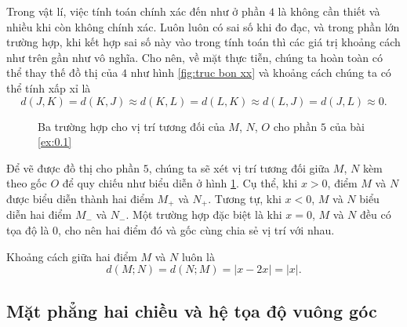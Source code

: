 \documentclass[a4paper, titlepage, openany]{book}
\begin{document}
Trong vật lí, việc tính toán chính xác đến như ở phần $4$ là không cần thiết và nhiều khi còn không chính xác. Luôn luôn có sai số khi đo đạc, và trong phần lớn trường hợp, khi kết hợp sai số này vào trong tính toán thì các giá trị khoảng cách như trên gần như vô nghĩa. Cho nên, về mặt thực tiễn, chúng ta hoàn toàn có thể thay thế đồ thị của $4$ như hình \ref{fig:truc bon xx} và khoảng cách chúng ta có thể tính xấp xỉ là $$d(J,K) = d(K,J) \approx d(K,L) = d(L,K) \approx d(L,J) = d(J,L) \approx 0.$$

\begin{figure}[h]
   \centering
   \caption{Ba trường hợp cho vị trí tương đối của $M$, $N$, $O$ cho phần $5$ của bài \ref{ex:0.1}}
   \label{fig:truc phan 5}
\end{figure}

Để vẽ được đồ thị cho phần $5$, chúng ta sẽ xét vị trí tương đối giữa $M$, $N$ kèm theo gốc $O$ để quy chiếu như biểu diễn ở hình \ref{fig:truc phan 5}. Cụ thể, khi $x>0$, điểm $M$ và $N$ được biểu diễn thành hai điểm $M_+$ và $N_+$. Tương tự, khi $x<0$, $M$ và $N$ biểu diễn hai điểm $M_-$ và $N_-$. Một trường hợp đặc biệt là khi $x=0$, $M$ và $N$ đều có tọa độ là $0$, cho nên hai điểm đó và gốc cùng chia sẻ vị trí với nhau.

Khoảng cách giữa hai điểm $M$ và $N$ luôn là $$d(M;N)=d(N;M)=|x-2x|=|x|.$$

\subsection{Mặt phẳng hai chiều và hệ tọa độ vuông góc}
\end{document}
